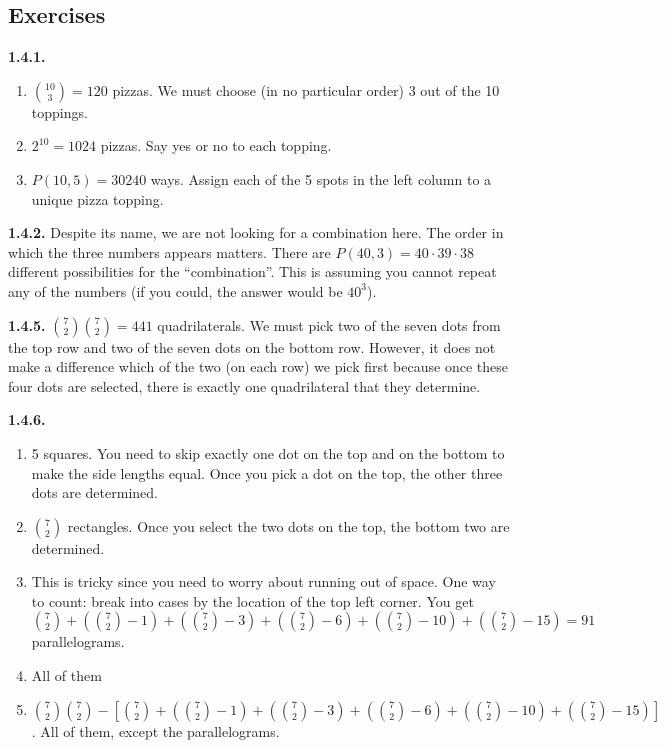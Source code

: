 \documentclass[12pt,]{book}
\theoremstyle{plain}
\theoremstyle{definition}
\theoremstyle{definition}
\theoremstyle{definition}
\numberwithin{equation}{chapter}
\begin{document}
\subsection*{ Exercises}
\noindent\textbf{1.4.1.} \hypertarget{p-967}{}%
\leavevmode%
\begin{enumerate}[label=(\alph*)]
\item\hypertarget{li-445}{}\({10 \choose 3} = 120\) pizzas.  We must choose (in no particular order) 3 out of the 10 toppings.%
\item\hypertarget{li-446}{}\(2^{10} = 1024\) pizzas.  Say yes or no to each topping.%
\item\hypertarget{li-447}{}\(P(10,5) = 30240\) ways.  Assign each of the 5 spots in the left column to a unique pizza topping.%
\end{enumerate}
%
\par\smallskip
\noindent\textbf{1.4.2.} \hypertarget{p-969}{}%
Despite its name, we are not looking for a combination here. The order in which the three numbers appears matters. There are \(P(40,3) = 40\cdot 39 \cdot 38\) different possibilities for the ``combination''. This is assuming you cannot repeat any of the numbers (if you could, the answer would be \(40^3\)).%
\par\smallskip
\noindent\textbf{1.4.5.} \hypertarget{p-978}{}%
\({7\choose 2}{7\choose 2} = 441\) quadrilaterals. We must pick two of the seven dots from the top row and two of the seven dots on the bottom row. However, it does not make a difference which of the two (on each row) we pick first because once these four dots are selected, there is exactly one quadrilateral that they determine.%
\par\smallskip
\noindent\textbf{1.4.6.} \hypertarget{p-985}{}%
\leavevmode%
\begin{enumerate}[label=(\alph*)]
\item\hypertarget{li-457}{}\hypertarget{p-986}{}%
5 squares. You need to skip exactly one dot on the top and on the bottom to make the side lengths equal.  Once you pick a dot on the top, the other three dots are determined.%
\item\hypertarget{li-458}{}\({7 \choose 2}\) rectangles.  Once you select the two dots on the top, the bottom two are determined.%
\item\hypertarget{li-459}{}\hypertarget{p-987}{}%
This is tricky since you need to worry about running out of space.  One way to count: break into cases by the location of the top left corner.  You get \({7 \choose 2} + ({7 \choose 2}-1) + ({7 \choose 2} - 3) + ({7 \choose 2} - 6) + ({7 \choose 2} - 10) + ({7 \choose 2} - 15) = 91\) parallelograms.%
\item\hypertarget{li-460}{}\hypertarget{p-988}{}%
All of them%
\item\hypertarget{li-461}{}\hypertarget{p-989}{}%
\({7\choose 2}{7\choose 2} - \left[ {7 \choose 2} + ({7 \choose 2}-1) + ({7 \choose 2} - 3) + ({7 \choose 2} - 6) + ({7 \choose 2} - 10) + ({7 \choose 2} - 15) \right]\). All of them, except the parallelograms.%
\end{enumerate}
\end{document}
